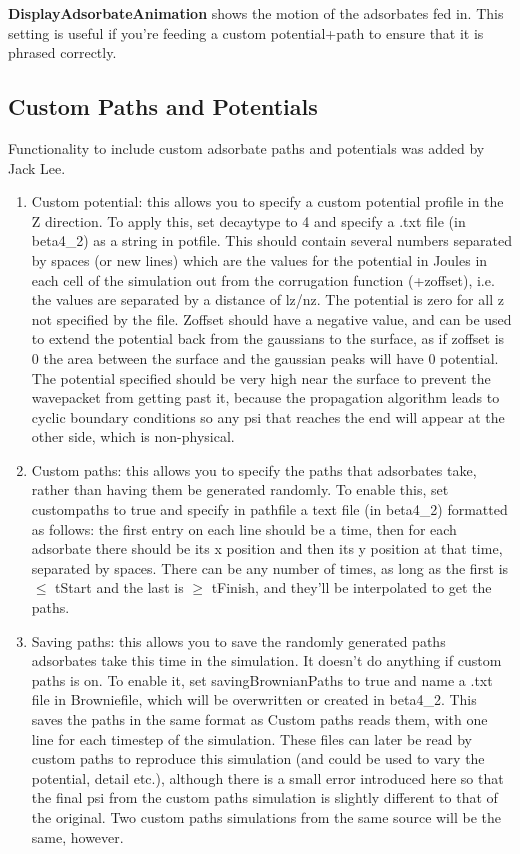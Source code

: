 \documentclass[11pt,letterpaper]{article}
\renewcommand{\\}{\bigskip}
\begin{document}
\textbf{DisplayAdsorbateAnimation} shows the motion of the adsorbates fed in. This setting is useful if you're feeding a custom potential+path to ensure that it is phrased correctly.\\






\subsection{Custom Paths and Potentials}
Functionality to include custom adsorbate paths and potentials was added by Jack Lee.

\begin{enumerate}
    \item Custom potential: this allows you to specify a custom potential profile in the Z direction. To apply this, set decaytype to 4 and specify a .txt file (in beta4\_2) as a string in potfile. This should contain several numbers separated by spaces (or new lines) which are the values for the potential in Joules in each cell of the simulation out from the corrugation function (+zoffset), i.e. the values are separated by a distance of lz/nz. The potential is zero for all z not specified by the file. Zoffset should have a negative value, and can be used to extend the potential back from the gaussians to the surface, as if zoffset is 0 the area between the surface and the gaussian peaks will have 0 potential. The potential specified should be very high near the surface to prevent the wavepacket from getting past it, because the propagation algorithm leads to cyclic boundary conditions so any psi that reaches the end will appear at the other side, which is non-physical.
    \item Custom paths: this allows you to specify the paths that adsorbates take, rather than having them be generated randomly. To enable this, set custompaths to true and specify in pathfile a text file (in beta4\_2) formatted as follows: the first entry on each line should be a time, then for each adsorbate there should be its x position and then its y position at that time, separated by spaces. There can be any number of times, as long as the first is $\leq$ tStart and the last is $\geq$ tFinish, and they’ll be interpolated to get the paths. 
    \item Saving paths: this allows you to save the randomly generated paths adsorbates take this time in the simulation. It doesn’t do anything if custom paths is on. To enable it, set savingBrownianPaths to true and name a .txt file in Browniefile, which will be overwritten or created in beta4\_2. This saves the paths in the same format as Custom paths reads them, with one line for each timestep of the simulation. These files can later be read by custom paths to reproduce this simulation (and could be used to vary the potential, detail etc.), although there is a small error introduced here so that the final psi from the custom paths simulation is slightly different to that of the original. Two custom paths simulations from the same source will be the same, however.
\end{enumerate}
\end{document}
